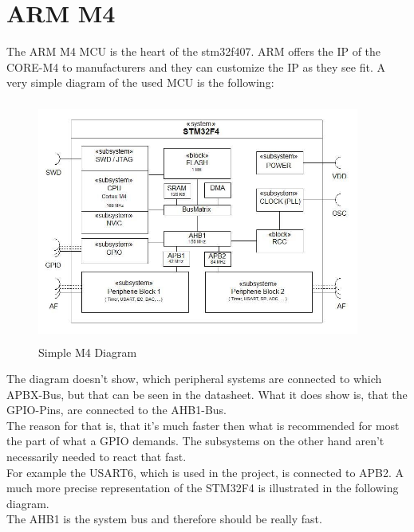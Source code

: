 \chapter{ARM M4}
The ARM M4 MCU is the heart of the stm32f407. ARM offers the IP of the
CORE-M4 to manufacturers and they can customize the IP as they see fit.
A very simple diagram of the used MCU is the following:\\

\begin{figure}[ht]
	\centering
	\includegraphics[width=400px,height=300px]{../img/stm32f4_prinzip.jpeg}
	\caption{Simple M4 Diagram}
	\label{m4_simple}
\end{figure}

The diagram doesn't show, which peripheral systems are connected to which
APBX-Bus, but that can be seen in the datasheet. What it does show is, that
the GPIO-Pins, are connected to the AHB1-Bus.\\
The reason for that is, that it's much faster then what is recommended
 for most the part of what a GPIO demands. The subsystems on the other hand aren't
 necessarily needed to react that fast.\\

For example the USART6, which is used in the project, is connected to APB2.
A much more precise representation of the STM32F4 is illustrated in the following diagram.\\

The AHB1 is the system bus and therefore should be really fast.

